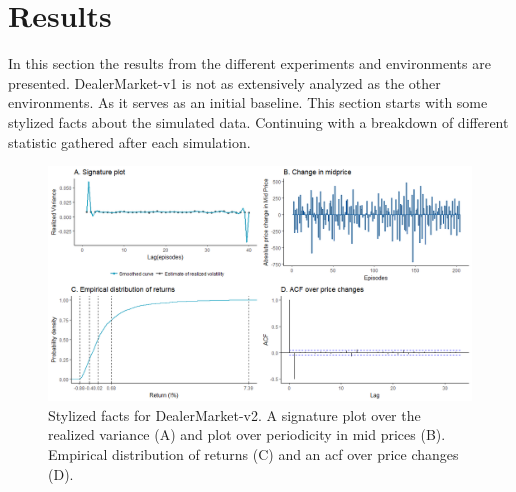 \documentclass{kththesis}
\theoremstyle{definition}
\begin{document}
\chapter{Results}\label{ch:6}
 In this section the results from the different experiments and environments are presented. DealerMarket-v1 is not as extensively analyzed as the other environments. As it serves as an initial baseline. This section starts with some stylized facts about the simulated data. Continuing with a breakdown of different statistic gathered after each simulation.

\begin{figure}[H]
		\centering
		\includegraphics[scale=.5]{dmv1_sf_multi.png}
		\caption{Stylized facts for DealerMarket-v2. A signature plot over the realized variance (A) and plot over periodicity in mid prices (B). Empirical distribution of returns (C) and an acf over price changes (D). }
		\label{fig:sf1}
\end{figure}
\end{document}
